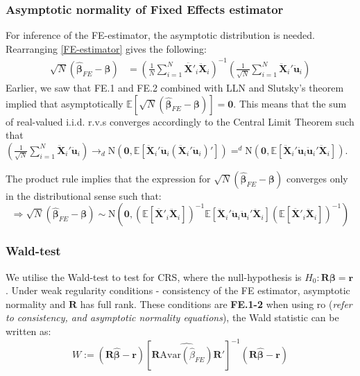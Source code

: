 \subsubsection{Asymptotic normality of Fixed Effects estimator}
For inference of the FE-estimator, the asymptotic distribution is needed. Rearranging \eqref{FE-estimator} gives the following:
\begin{align*}
    \sqrt{N}(\pmb{\hat{\beta}}_{FE}-\pmb{\beta})&=  \left( \frac{1}{N} \sum_{i=1}^N {\pmb{\ddot{X'}}_{i} \pmb{\ddot{X}}_{i} } \right) ^{-1} \left( \frac{1}{\sqrt{N}} \sum_{i=1}^N {\pmb{\ddot{X}}_i' \pmb{\ddot{u}}_i} \right)
\end{align*}
Earlier, we saw that FE.1 and FE.2 combined with LLN and Slutsky's theorem implied that asymptotically $\mathbb{E}[\sqrt{N}(\pmb{\hat{\beta}}_{FE}-\pmb{\beta})]=\pmb{0}$. This means that the sum of real-valued i.i.d. r.v.s converges accordingly to the Central Limit Theorem such that $\left( \frac{1}{\sqrt{N}} \sum_{i=1}^N {\pmb{\ddot{X}}_i' \pmb{\ddot{u}}_i} \right)\rightarrow _d \text{N}(\pmb{0},\mathbb{E}[\pmb{\ddot{X}}_i' \pmb{\ddot{u}}_i(\pmb{\ddot{X}}_i' \pmb{\ddot{u}}_i)'])=^d \text{N}(\pmb{0},\mathbb{E}[\pmb{\ddot{X}}_i' \pmb{\ddot{u}}_i\pmb{\ddot{u}}_i'\pmb{\ddot{X}}_i])$.

The product rule implies that the expression for $\sqrt{N}(\pmb{\hat{\beta}}_{FE}-\pmb{\beta})$ converges only in the distributional sense such that:
$$\Rightarrow \sqrt{N}(\pmb{\hat{\beta}}_{FE}-\pmb{\beta}) \sim \text{N} \left(\pmb{0},
(\mathbb{E}[\pmb{\ddot{X'}}_{i} \pmb{\ddot{X}}_{i}])^{-1} \mathbb{E}[\pmb{\ddot{X}}_i' \pmb{\ddot{u}}_i\pmb{\ddot{u}}_i'\pmb{\ddot{X}}_i] (\mathbb{E}[\pmb{\ddot{X'}}_{i} \pmb{\ddot{X}}_{i}])^{-1} \right)$$



\subsubsection*{Wald-test}
We utilise the Wald-test to test for CRS, where the null-hypothesis is $H_0: \mathbf{R}\boldsymbol{\beta}=\mathbf{r}$. Under weak regularity conditions - consistency of the FE estimator, asymptotic normality and $\mathbf{R}$ has full rank. These conditions are \textbf{FE.1-2} when using ro (\textit{refer to  consistency, and asymptotic normality equations}), the Wald statistic can be written as:
\begin{equation*}
    W:=(\mathbf{R}\widehat{\boldsymbol{\beta}}-\mathbf{r})[\mathbf{R}\widehat{\text{Avar}(\widehat{\beta}_{FE})}\mathbf{R}']^{-1}(\mathbf{R} \boldsymbol{\widehat{\beta}}-\mathbf{r})
\end{equation*}

